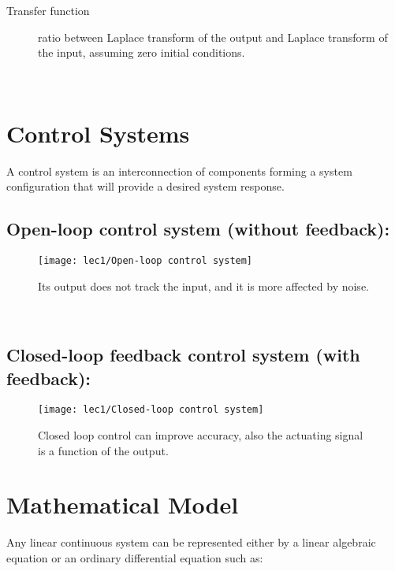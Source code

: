\begin{description}
	\item[Transfer function] ratio between Laplace transform of the output and Laplace transform of the input, assuming zero initial conditions.
\end{description}
 \leavevmode\\[-5em]



\section{Control Systems}
A control system is an interconnection of components forming a system configuration that will provide a desired system response.
\\[-2em]

\subsection[Open-loop control system]{Open-loop control system (without feedback):}
\begin{figure}[hb]
		\raggedleft
		\texttt{[image: lec1/Open-loop control system]}
		\caption[Open-loop: block diagram]{Its output does not track the input, and it is more affected by noise.}
\end{figure}
 \leavevmode\\[-4em]

\subsection[Closed-loop control system]{Closed-loop feedback control system (with feedback):}

\begin{figure}[hb]
		\raggedleft
		\texttt{[image: lec1/Closed-loop control system]}
		\caption[Closed-loop: block diagram]{Closed loop control can improve accuracy, also the actuating signal is a function of the output.}
\end{figure}



\section{Mathematical Model}
Any linear continuous system can be represented either by a linear algebraic equation or an ordinary differential equation such as:\\[-4mm]

